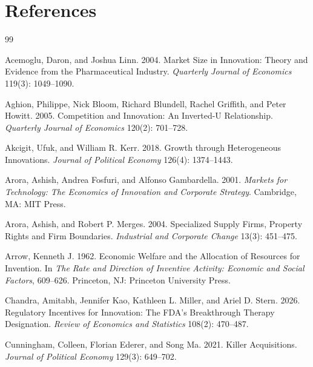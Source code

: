 \documentclass[12pt]{article}
\newcommand{\1}{\mathbf{1}}
\begin{document}
\section{References}

\begin{thebibliography}{99}

Acemoglu, Daron, and Joshua Linn. 2004.
\newblock Market Size in Innovation: Theory and Evidence from the Pharmaceutical Industry.
\newblock \emph{Quarterly Journal of Economics} 119(3): 1049--1090.

Aghion, Philippe, Nick Bloom, Richard Blundell, Rachel Griffith, and Peter Howitt. 2005.
\newblock Competition and Innovation: An Inverted-U Relationship.
\newblock \emph{Quarterly Journal of Economics} 120(2): 701--728.

Akcigit, Ufuk, and William R. Kerr. 2018.
\newblock Growth through Heterogeneous Innovations.
\newblock \emph{Journal of Political Economy} 126(4): 1374--1443.

Arora, Ashish, Andrea Fosfuri, and Alfonso Gambardella. 2001.
\newblock \emph{Markets for Technology: The Economics of Innovation and Corporate Strategy}.
\newblock Cambridge, MA: MIT Press.

Arora, Ashish, and Robert P. Merges. 2004.
\newblock Specialized Supply Firms, Property Rights and Firm Boundaries.
\newblock \emph{Industrial and Corporate Change} 13(3): 451--475.

Arrow, Kenneth J. 1962.
\newblock Economic Welfare and the Allocation of Resources for Invention.
\newblock In \emph{The Rate and Direction of Inventive Activity: Economic and Social Factors}, 609--626.
\newblock Princeton, NJ: Princeton University Press.

Chandra, Amitabh, Jennifer Kao, Kathleen L. Miller, and Ariel D. Stern. 2026.
\newblock Regulatory Incentives for Innovation: The FDA's Breakthrough Therapy Designation.
\newblock \emph{Review of Economics and Statistics} 108(2): 470--487.

Cunningham, Colleen, Florian Ederer, and Song Ma. 2021.
\newblock Killer Acquisitions.
\newblock \emph{Journal of Political Economy} 129(3): 649--702.


\end{thebibliography}
\end{document}
